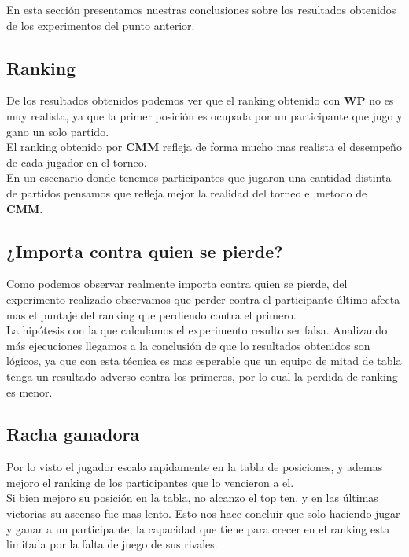 En esta sección presentamos nuestras conclusiones sobre los resultados obtenidos de los experimentos del punto anterior. \\

\subsection{Ranking}

De los resultados obtenidos podemos ver que el ranking obtenido con \textbf{WP} no es muy realista, ya que la primer posición es ocupada por un participante que jugo y gano un solo partido. \\

El ranking obtenido por \textbf{CMM} refleja de forma mucho mas realista el desempeño de cada jugador en el torneo. \\

En un escenario donde tenemos participantes que jugaron una cantidad distinta de partidos pensamos que refleja mejor la realidad del torneo el metodo de \textbf{CMM}. \\


\subsection{¿Importa contra quien se pierde?}

Como podemos observar realmente importa contra quien se pierde, del experimento realizado observamos que perder contra el participante último afecta mas el puntaje del ranking que perdiendo 
contra el primero. \\

La hipótesis con la que calculamos el experimento resulto ser falsa. Analizando más ejecuciones llegamos a la conclusión de que lo resultados obtenidos son lógicos, ya que con esta técnica 
es mas esperable que un equipo de mitad de tabla tenga un resultado adverso contra los primeros, por lo cual la perdida de ranking es menor. \\


\subsection{Racha ganadora}

Por lo visto el jugador escalo rapidamente en la tabla de posiciones, y ademas mejoro el ranking de los participantes que lo vencieron a el.\\

Si bien mejoro su posición en la tabla, no alcanzo el top ten, y en las últimas victorias su ascenso fue mas lento. Esto nos hace concluir que solo haciendo jugar y ganar 
a un participante, la capacidad que tiene para crecer en el ranking esta limitada por la falta de juego de sus rivales.



